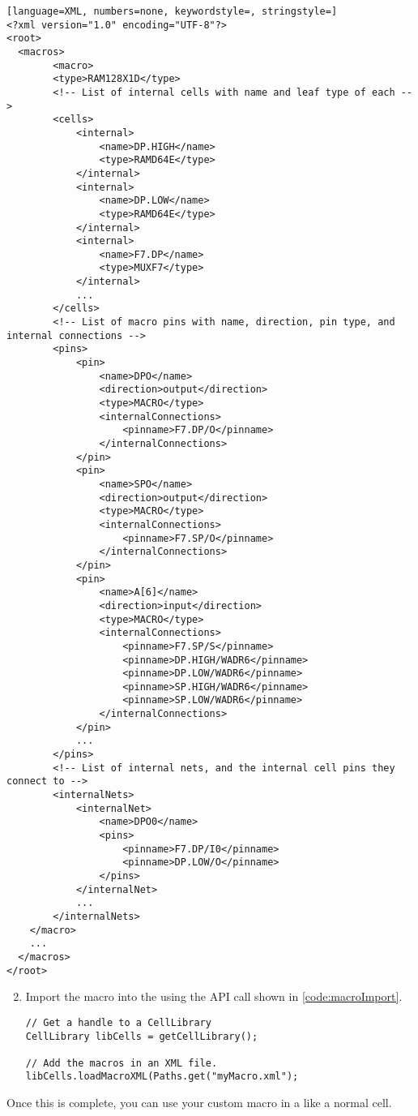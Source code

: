 \begin{lstlisting}[language=XML, numbers=none, keywordstyle=, stringstyle=]
<?xml version="1.0" encoding="UTF-8"?>
<root>	
  <macros>    
		<macro>
        <type>RAM128X1D</type>
        <!-- List of internal cells with name and leaf type of each -->
        <cells>
            <internal>
                <name>DP.HIGH</name>
                <type>RAMD64E</type>
            </internal>
            <internal>
                <name>DP.LOW</name>
                <type>RAMD64E</type>
            </internal>
            <internal>
                <name>F7.DP</name>
                <type>MUXF7</type>
            </internal>
			...
        </cells>
        <!-- List of macro pins with name, direction, pin type, and internal connections --> 
        <pins>
            <pin>
                <name>DPO</name>
                <direction>output</direction>
                <type>MACRO</type>
                <internalConnections>
                    <pinname>F7.DP/O</pinname>
                </internalConnections>
            </pin>
            <pin>
                <name>SPO</name>
                <direction>output</direction>
                <type>MACRO</type>
                <internalConnections>
                    <pinname>F7.SP/O</pinname>
                </internalConnections>
            </pin>
            <pin>
                <name>A[6]</name>
                <direction>input</direction>
                <type>MACRO</type>
                <internalConnections>
                    <pinname>F7.SP/S</pinname>
                    <pinname>DP.HIGH/WADR6</pinname>
                    <pinname>DP.LOW/WADR6</pinname>
                    <pinname>SP.HIGH/WADR6</pinname>
                    <pinname>SP.LOW/WADR6</pinname>
                </internalConnections>
            </pin>
            ...
        </pins>
        <!-- List of internal nets, and the internal cell pins they connect to --> 
        <internalNets>
            <internalNet>
                <name>DPO0</name>
                <pins>
                    <pinname>F7.DP/I0</pinname>
                    <pinname>DP.LOW/O</pinname>
                </pins>
            </internalNet>
            ...
        </internalNets>
    </macro>
	...
  </macros>
</root>
\end{lstlisting}

\begin{enumerate}
 \setcounter{enumi}{1} 
  \item Import the macro into the  using the API call shown in
  \autoref{code:macroImport}.

\begin{lstlisting}[caption=Adding new macros to the Cell Library,
label=code:macroImport] 
// Get a handle to a CellLibrary
CellLibrary libCells = getCellLibrary();

// Add the macros in an XML file.
libCells.loadMacroXML(Paths.get("myMacro.xml"); 
\end{lstlisting}

\end{enumerate}

\noindent
Once this is complete, you can use your custom macro in a  like
a normal cell.

